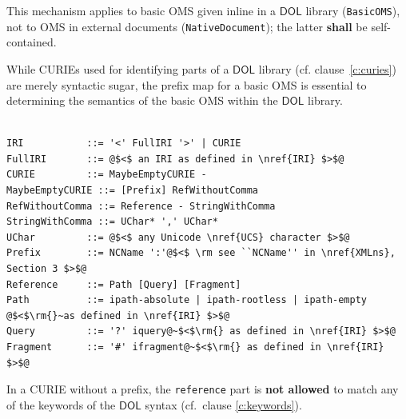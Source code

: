 \documentclass[10pt, a4paper]{isov2}
\makeatletter
\newcommand*{\cf}{cf.\@\xspace}
\newcommand*{\eg}{e.g.\@\xspace}
\newcommand*\CommentAuthor{}
\renewcommand*\CommentAuthor{#1}}
\newcommand*\CommentDate{}
\renewcommand*\CommentDate{#1}}
\newcommand*\CommentId{}
\renewcommand*\CommentId{#1}}
\newcommand*\CommentType{}
\renewcommand*\CommentType{#1}}
\newcommand*{\SetCommentColorByType}[1]{%
\edef\localType{{#1}}%
\expandafter\ifstrequal\localType{q-aut}{\colorlet{CommentColor}{red}}{%
\expandafter\ifstrequal\localType{q-all}{\colorlet{CommentColor}{orange}}{%
\expandafter\ifstrequal\localType{todo}{\colorlet{CommentColor}{orange}}{%
\expandafter\ifstrequal\localType{fyi}{\colorlet{CommentColor}{lightgray}}{%
\colorlet{CommentColor}{yellow}}}}}}
\newcommand*{\SetCommentPrefixByType}[1]{%
\edef\localType{{#1}}%
\expandafter\@ifmtarg\localType{%
\edef\CommentPrefix{}%
}{%
\caseupper[q]{#1}%
\edef\CommentPrefix{\thestring: }%
}}
\newcommand*{\initComment}[1]{%
\setkeys{Comment}{#1}%
\SetCommentColorByType{\CommentType}%
\relax%
\SetCommentPrefixByType{\CommentType}%
\relax%
}
\newcommand*{\todonote}[2][]{%
\initComment{#1}%
\pdfcomment[author=\CommentAuthor,color=CommentColor,date=\CommentDate,id=\CommentId]{%
\CommentPrefix
#2}}
\renewcommand*{\todonote}[2][]{%
\initComment{#1}%
\ednote{\CommentPrefix #2}}
\newcommand*{\syntax}[1]{\texttt{#1}}
\newcommand*{\notallowed}{\textbf{not allowed}\xspace}
\newcommand*{\shall}{\textbf{shall}\xspace}
\newcommand*{\DOL}{\ensuremath{\mathsf{DOL}}\xspace}
\renewcommand{\clauserefname}{clause}
\renewcommand{\noterefname}{note}
\renewcommand{\cref}[1]{\clauserefname~\ref{#1}}
\renewcommand{\nref}[1]{\noterefname~\ref{#1}}
\renewcommand{\nref}[1]{\ref{nref-#1}}
\makeatother
\begin{document}
This mechanism applies to basic OMS given inline in a \DOL library (\syntax{BasicOMS}), not to OMS in external documents (\syntax{NativeDocument}); the latter \shall be self-contained.

While CURIEs used for identifying parts of a \DOL library (\cf \cref{c:curies}) are merely syntactic 
sugar, the prefix map for a basic OMS is essential to determining the semantics of the basic OMS 
within the \DOL library. 



\label{c:curie-syntax}

\vspace{-1.4em}
\begin{lstlisting}[language=ebnf,escapeinside={@@}]

IRI           ::= '<' FullIRI '>' | CURIE
FullIRI       ::= @$<$ an IRI as defined in \nref{IRI} $>$@
CURIE         ::= MaybeEmptyCURIE -
MaybeEmptyCURIE ::= [Prefix] RefWithoutComma
RefWithoutComma ::= Reference - StringWithComma
StringWithComma ::= UChar* ',' UChar*
UChar         ::= @$<$ any Unicode \nref{UCS} character $>$@ 
Prefix        ::= NCName ':'@$<$ \rm see ``NCName'' in \nref{XMLns}, Section 3 $>$@
Reference     ::= Path [Query] [Fragment]
Path          ::= ipath-absolute | ipath-rootless | ipath-empty @$<$\rm{}~as defined in \nref{IRI} $>$@
Query         ::= '?' iquery@~$<$\rm{} as defined in \nref{IRI} $>$@
Fragment      ::= '#' ifragment@~$<$\rm{} as defined in \nref{IRI} $>$@
\end{lstlisting}

In a CURIE without a prefix, the \syntax{reference} part is \notallowed to match any of the keywords of the \DOL syntax (cf.\ clause \ref{c:keywords}).

\medspace








\end{document}
